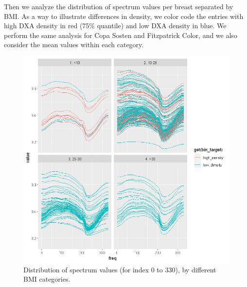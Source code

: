 \documentclass[letterpaper,11pt]{article}
\begin{document}
Then we analyze the distribution of spectrum values per breast separated by BMI. As a way to illustrate differences in density, we color code the entries with high DXA density in red (75\% quantile) and low DXA density in blue. We perform the same analysis for Copa Sosten and Fitzpatrick Color, and we also consider the mean values within each category.
\begin{figure}[!htb]
	\centering
	\includegraphics[trim={0 0cm 0cm 0}, clip, scale=0.55]{figures/scio_by_bmi.png}
	\caption{Distribution of spectrum values (for index 0 to 330), by different BMI categories.} 
	\label{fig:scio_bmi}
\end{figure}
\end{document}
